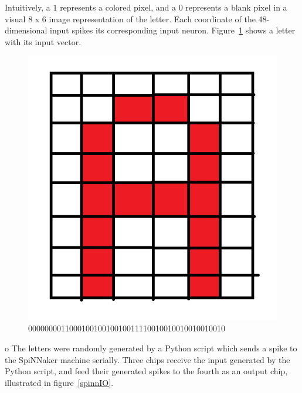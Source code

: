 \documentclass[journal]{./sty/IEEEtran}
\begin{document}
Intuitively, a $1$ represents a colored pixel, and a $0$ represents a blank pixel in a visual $8$ x $6$ image representation of the letter. 
Each coordinate of the 48-dimensional input spikes its corresponding input neuron. Figure~\ref{fig:A} shows a letter with its input vector.

\begin{figure}
\centering
\includegraphics[scale=0.3]{imgs/A.png}
\caption{000000001100010010010010011110010010010010010010\label{fig:A}}
\end{figure}
o
The letters were randomly generated by a Python script which sends a spike to the SpiNNaker machine serially. Three chips receive the input generated by the Python script, and feed their generated spikes to the fourth as an output chip, illustrated in figure~\ref{spinnIO}.
\end{document}
